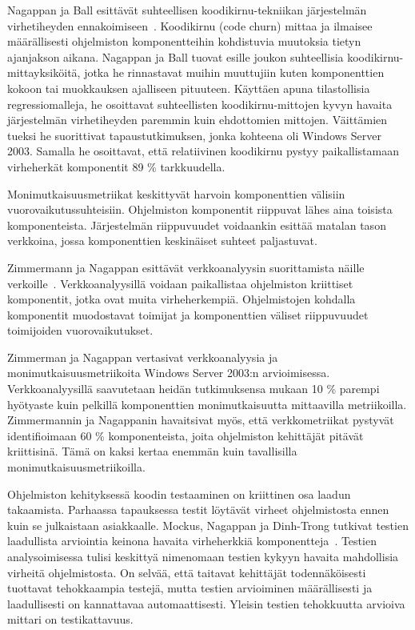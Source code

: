 \documentclass[finnish]{../tktltiki2}
\theoremstyle{definition}
\theoremstyle{remark}
\begin{document}
    Nagappan ja Ball esittävät suhteellisen koodikirnu-tekniikan järjestelmän virhetiheyden ennakoimiseen~\cite{NB05}. 
Koodikirnu (code churn) mittaa ja ilmaisee määrällisesti ohjelmiston komponentteihin kohdistuvia muutoksia tietyn 
ajanjakson aikana. Nagappan ja Ball tuovat esille joukon suhteellisia koodikirnu-mittayksiköitä, jotka he rinnastavat 
muihin muuttujiin kuten komponenttien kokoon tai muokkauksen ajalliseen pituuteen. Käyttäen apuna tilastollisia 
regressiomalleja, he osoittavat suhteellisten koodikirnu-mittojen kyvyn havaita järjestelmän virhetiheyden paremmin kuin 
ehdottomien mittojen. Väittämien tueksi he suorittivat tapaustutkimuksen, jonka kohteena oli Windows Server 2003. 
Samalla he osoittavat, että relatiivinen koodikirnu pystyy paikallistamaan virheherkät komponentit 89 \% tarkkuudella.

    Monimutkaisuusmetriikat keskittyvät harvoin komponenttien välisiin vuorovaikutussuhteisiin. Ohjelmiston komponentit 
riippuvat lähes aina toisista komponenteista. Järjestelmän riippuvuudet voidaankin esittää matalan tason verkkoina, 
jossa komponenttien keskinäiset suhteet paljastuvat.

    Zimmermann ja Nagappan esittävät verkkoanalyysin suorittamista näille verkoille~\cite{ZN08}. Verkkoanalyysillä 
voidaan paikallistaa ohjelmiston kriittiset komponentit, jotka ovat muita virheherkempiä. Ohjelmistojen kohdalla 
komponentit muodostavat toimijat ja komponenttien väliset riippuvuudet toimijoiden vuorovaikutukset.

    Zimmerman ja Nagappan vertasivat verkkoanalyysia ja monimutkaisuusmetriikoita Windows Server 2003:n arvioimisessa. 
Verkkoanalyysillä saavutetaan heidän tutkimuksensa mukaan 10 \% parempi hyötyaste kuin pelkillä komponenttien 
monimutkaisuutta mittaavilla metriikoilla. Zimmermannin ja Nagappanin havaitsivat myös, että verkkometriikat pystyvät 
identifioimaan 60 \% komponenteista, joita ohjelmiston kehittäjät pitävät kriittisinä. Tämä on kaksi kertaa enemmän kuin 
tavallisilla monimutkaisuusmetriikoilla.

    Ohjelmiston kehityksessä koodin testaaminen on kriittinen osa laadun takaamista. Parhaassa tapauksessa testit 
löytävät virheet ohjelmistosta ennen kuin se julkaistaan asiakkaalle. Mockus, Nagappan ja Dinh-Trong tutkivat testien 
laadullista arviointia keinona havaita virheherkkiä komponentteja~\cite{MND09}. Testien analysoimisessa tulisi keskittyä 
nimenomaan testien kykyyn havaita mahdollisia virheitä ohjelmistosta. On selvää, että taitavat kehittäjät 
todennäköisesti tuottavat tehokkaampia testejä, mutta testien arvioiminen määrällisesti ja laadullisesti on kannattavaa 
automaattisesti. Yleisin testien tehokkuutta arvioiva mittari on testikattavuus.
\end{document}
